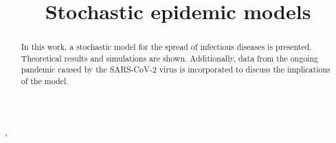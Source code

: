\documentclass[aap]{imsart}
\theoremstyle{remark}
\begin{document}
\begin{frontmatter}
\title{Stochastic epidemic models}

\begin{aug}
\author[A]{ },
\address[A]{Facultad de Ingenier\'ia Mec\'anica y El\'ectrica,
Universidad Aut\'onoma de Nuevo Le\'on,
}

\end{aug}

\begin{abstract}
In this work, a stochastic model for the spread of infectious diseases is presented. Theoretical results and simulations are shown. Additionally, data from the ongoing pandemic caused by the SARS-CoV-2 virus is incorporated to discuss the implications of the model.
%
\end{abstract}

\begin{keyword}[class=MSC2020]
\end{keyword}

\begin{keyword}
\end{keyword}

\end{frontmatter}
\end{document}
